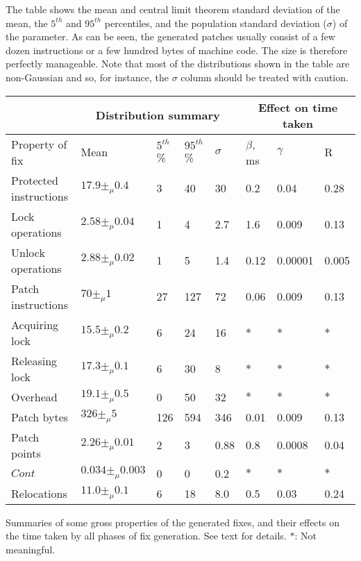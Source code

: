 The table shows the mean and central limit theorem standard deviation
of the mean, the $5^{th}$ and $95^{th}$ percentiles, and the
population standard deviation ($\sigma$) of the parameter.  As can be
seen, the generated patches usually consist of a few dozen
instructions or a few hundred bytes of machine code.  The size is
therefore perfectly manageable.  Note that most of the distributions
shown in the table are non-Gaussian and so, for instance, the $\sigma$
column should be treated with caution.

\begin{sanetab}
  \begin{tabular}{|l|l|l|l|l|l|l|l|}
    \hline
                           & \multicolumn{4}{c|}{Distribution summary} & \multicolumn{3}{c|}{Effect on time taken} \\
    \hline
    Property of fix        & Mean & $5^{th}$\% & $95^{th}$\% & $\sigma$ & $\beta$, ms & $\gamma$ & R\\
    \hline
    Protected instructions & $17.9 \pm_\mu 0.4$  & 3   & 40  & 30  & 0.2  & 0.04 & 0.28 \\
    Lock operations        & $2.58 \pm_\mu 0.04$ & 1   & 4   & 2.7 & 1.6  & 0.009& 0.13 \\
    Unlock operations      & $2.88 \pm_\mu 0.02$ & 1   & 5   & 1.4 & 0.12 & 0.00001& 0.005 \\
    Patch instructions     & $70 \pm_\mu 1$      & 27  & 127 & 72  & 0.06 & 0.009& 0.13\\
    \hspace{5mm}Acquiring lock&$15.5 \pm_\mu 0.2$& 6   & 24  & 16  &$\ast$&$\ast$& $\ast$\\
    \hspace{5mm}Releasing lock&$17.3 \pm_\mu 0.1$& 6   & 30  & 8   &$\ast$&$\ast$& $\ast$\\
    \hspace{5mm}Overhead   & $19.1 \pm_\mu 0.5$  & 0   & 50  & 32  &$\ast$&$\ast$& $\ast$\\
    Patch bytes            & $326 \pm_\mu 5$     & 126 & 594 & 346 & 0.01 & 0.009& 0.13\\
    Patch points           & $2.26 \pm_\mu 0.01$ & 2   & 3   & 0.88& 0.8  & 0.0008& 0.04\\
    $\mathit{Cont}$        &$0.034 \pm_\mu 0.003$& 0   & 0   & 0.2 &$\ast$&$\ast$& $\ast$\\
    Relocations            & $11.0 \pm_\mu 0.1$  & 6   & 18  & 8.0 & 0.5  & 0.03 & 0.24\\
    \hline
  \end{tabular}
  \caption{Summaries of some gross properties of the generated fixes,
    and their effects on the time taken by all phases of fix
    generation.  See text for details. $\ast$: Not meaningful.}
  \label{tab:eval:gen_fix_perf:props}
\end{sanetab}

